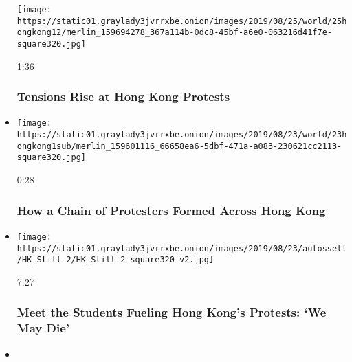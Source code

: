 \begin{itemize}
  \texttt{[image: https://static01.graylady3jvrrxbe.onion/images/2019/08/25/world/25hongkong12/merlin\_159694278\_367a114b-0dc8-45bf-a6e0-063216d41f7e-square320.jpg]}

  1:36

  \hypertarget{tensions-rise-at-hong-kong-protests}{%
  \subsubsection{Tensions Rise at Hong Kong
  Protests}\label{tensions-rise-at-hong-kong-protests}}
\item
  \href{https://www.nytimes3xbfgragh.onion/video/world/asia/100000006677711/hong-kong-human-chain.html?action=click\&module=video-series-bar\&region=header\&pgtype=Article\&playlistId=video/hk-protest}{}

  \texttt{[image: https://static01.graylady3jvrrxbe.onion/images/2019/08/23/world/23hongkong1sub/merlin\_159601116\_66658ea6-5dbf-471a-a083-230621cc2113-square320.jpg]}

  0:28

  \hypertarget{how-a-chain-of-protesters-formed-across-hong-kong}{%
  \subsubsection{How a Chain of Protesters Formed Across Hong
  Kong}\label{how-a-chain-of-protesters-formed-across-hong-kong}}
\item
  \href{https://www.nytimes3xbfgragh.onion/video/world/asia/100000006664889/we-may-die-we-may-be-jailed-on-the-frontlines-with-hong-kongs-protesters.html?action=click\&module=video-series-bar\&region=header\&pgtype=Article\&playlistId=video/hk-protest}{}

  \texttt{[image: https://static01.graylady3jvrrxbe.onion/images/2019/08/23/autossell/HK\_Still-2/HK\_Still-2-square320-v2.jpg]}

  7:27

  \hypertarget{meet-the-students-fueling-hong-kongs-protests-we-may-die}{%
  \subsubsection{Meet the Students Fueling Hong Kong's Protests: `We May
  Die'}\label{meet-the-students-fueling-hong-kongs-protests-we-may-die}}
\item
  \href{https://www.nytimes3xbfgragh.onion/video/world/asia/100000006660097/foreign-agents-and-terrorists-how-china-is-framing-hong-kongs-protests.html?action=click\&module=video-series-bar\&region=header\&pgtype=Article\&playlistId=video/hk-protest}{}


\end{itemize}
